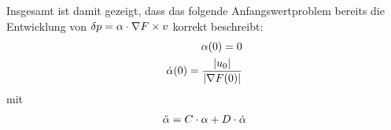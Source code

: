 Insgesamt ist damit gezeigt,
dass das folgende Anfangswertproblem bereits die Entwicklung
von $ \delta p  =  \alpha \cdot \nabla F \times v $ korrekt beschreibt:
\begin{align}
    \alpha( 0 )  =  0  \\
    \dot{ \alpha }( 0 )  =  \frac{ \lvert  u_0  \rvert }{ \lvert  \nabla F( 0 )  \rvert }
\end{align}
mit
\begin{align}
    \ddot{ \alpha }   =
    C \cdot \alpha  +  D \cdot \dot{ \alpha }
\end{align}